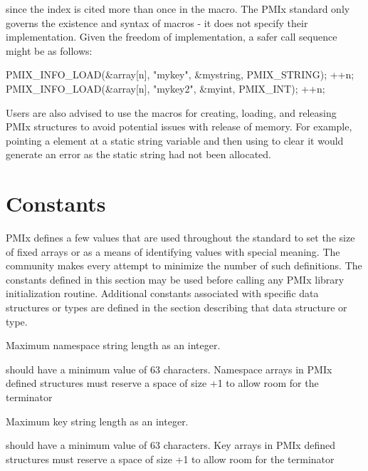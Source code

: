 since the index is cited more than once in the macro. The \ac{PMIx} standard only governs the existence and syntax of macros - it does not specify their implementation. Given the freedom of implementation, a safer call sequence might be as follows:

\begin{codepar}
PMIX_INFO_LOAD(&array[n], "mykey", &mystring, PMIX_STRING);
++n;
PMIX_INFO_LOAD(&array[n], "mykey2", &myint, PMIX_INT);
++n;
\end{codepar}

Users are also advised to use the macros for creating, loading, and releasing
\ac{PMIx} structures to avoid potential issues with release of memory. For
example, pointing a  element at a static string
variable and then using  to clear it would
generate an error as the static string had not been allocated.

\adviceuserend

\section{Constants}

\ac{PMIx} defines a few values that are used throughout the standard to set the size of fixed arrays or as a means of identifying values with special meaning.
The community makes every attempt to minimize the number of such definitions.
The constants defined in this section may be used before calling any \ac{PMIx} library initialization routine.
Additional constants associated with specific data structures or types are defined in the section describing that data structure or type.

\begin{constantdesc}
%
Maximum namespace string length as an integer.
\end{constantdesc}

\adviceimplstart
{} should have a minimum value of 63 characters. Namespace arrays in \ac{PMIx} defined structures must reserve
a space of size +1 to allow room for the  terminator
\adviceimplend

\begin{constantdesc}
%
Maximum key string length as an integer.
\end{constantdesc}

\adviceimplstart
{} should have a minimum value of 63 characters. Key arrays in \ac{PMIx} defined structures must reserve
a space of size +1 to allow room for the  terminator
\adviceimplend

